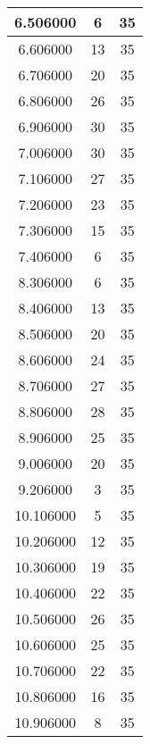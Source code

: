 \begin{longtable}[htbp]{|c|c|c|}
6.506000 & 6 & 35 \\ \hline
6.606000 & 13 & 35 \\ \hline
6.706000 & 20 & 35 \\ \hline
6.806000 & 26 & 35 \\ \hline
6.906000 & 30 & 35 \\ \hline
7.006000 & 30 & 35 \\ \hline
7.106000 & 27 & 35 \\ \hline
7.206000 & 23 & 35 \\ \hline
7.306000 & 15 & 35 \\ \hline
7.406000 & 6 & 35 \\ \hline
8.306000 & 6 & 35 \\ \hline
8.406000 & 13 & 35 \\ \hline
8.506000 & 20 & 35 \\ \hline
8.606000 & 24 & 35 \\ \hline
8.706000 & 27 & 35 \\ \hline
8.806000 & 28 & 35 \\ \hline
8.906000 & 25 & 35 \\ \hline
9.006000 & 20 & 35 \\ \hline
9.206000 & 3 & 35 \\ \hline
10.106000 & 5 & 35 \\ \hline
10.206000 & 12 & 35 \\ \hline
10.306000 & 19 & 35 \\ \hline
10.406000 & 22 & 35 \\ \hline
10.506000 & 26 & 35 \\ \hline
10.606000 & 25 & 35 \\ \hline
10.706000 & 22 & 35 \\ \hline
10.806000 & 16 & 35 \\ \hline
10.906000 & 8 & 35 \\ \hline
\end{longtable}
